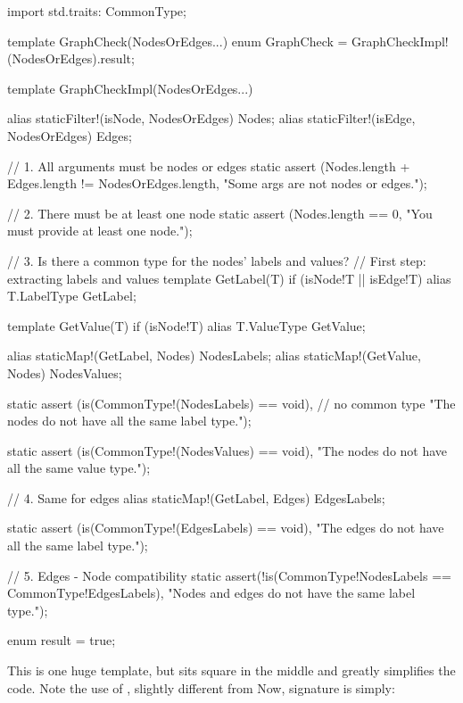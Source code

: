 \begin{dcode}
import std.traits: CommonType;

template GraphCheck(NodesOrEdges...)
{
    enum GraphCheck = GraphCheckImpl!(NodesOrEdges).result;
}

template GraphCheckImpl(NodesOrEdges...)
{
    alias staticFilter!(isNode, NodesOrEdges) Nodes;
    alias staticFilter!(isEdge, NodesOrEdges) Edges;
    
    // 1. All arguments must be nodes or edges
    static assert (Nodes.length + Edges.length != NodesOrEdges.length,
                   "Some args are not nodes or edges.");
    
    // 2. There must be at least one node
    static assert (Nodes.length == 0,
                   "You must provide at least one node.");
    
    // 3. Is there a common type for the nodes' labels and values?
    // First step: extracting labels and values
    template GetLabel(T) if (isNode!T || isEdge!T)
    {
        alias T.LabelType GetLabel;
    }
    
    template GetValue(T) if (isNode!T)
    {
        alias T.ValueType GetValue;
    }

    alias staticMap!(GetLabel, Nodes) NodesLabels;
    alias staticMap!(GetValue, Nodes) NodesValues; 
    
    static assert (is(CommonType!(NodesLabels) == void), // no common type
                   "The nodes do not have all the same label type.");
    
    static assert (is(CommonType!(NodesValues) == void),
                   "The nodes do not have all the same value type.");

    // 4. Same for edges
    alias staticMap!(GetLabel, Edges) EdgesLabels;  
    
    static assert (is(CommonType!(EdgesLabels) == void),
                   "The edges do not have all the same label type.");
        
    // 5. Edges - Node compatibility
    static assert(!is(CommonType!NodesLabels == CommonType!EdgesLabels),
                  "Nodes and edges do not have the same label type.");
    
    enum result = true;
}    
\end{dcode}

This is one huge template, but  sits square in the middle and greatly simplifies the code. Note the use of , slightly different from Now,  signature is simply:

